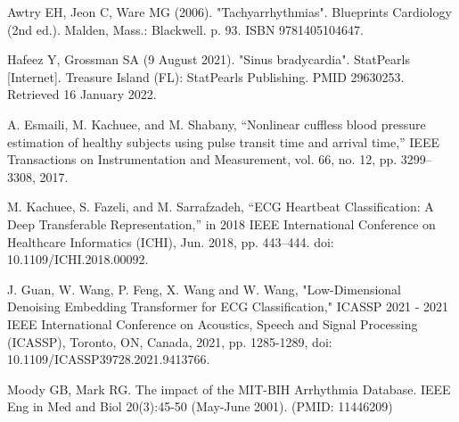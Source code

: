 \documentclass[conference]{IEEEtran}
\begin{document}
	\begin{thebibliography}{9}
	 Awtry EH, Jeon C, Ware MG (2006). "Tachyarrhythmias". Blueprints Cardiology (2nd ed.). Malden, Mass.: Blackwell. p. 93. ISBN 9781405104647.
	
	 Hafeez Y, Grossman SA (9 August 2021). "Sinus bradycardia". StatPearls [Internet]. Treasure Island (FL): StatPearls Publishing. PMID 29630253. Retrieved 16 January 2022.
	
	 A. Esmaili, M. Kachuee, and M. Shabany, “Nonlinear cuffless blood pressure estimation of healthy subjects using pulse transit time and arrival time,” IEEE Transactions on Instrumentation and Measurement, vol. 66, no. 12, pp. 3299–3308, 2017.
		
	 M. Kachuee, S. Fazeli, and M. Sarrafzadeh, “ECG Heartbeat Classification: A Deep Transferable Representation,” in 2018 IEEE International Conference on Healthcare Informatics (ICHI), Jun. 2018, pp. 443–444. doi: 10.1109/ICHI.2018.00092.
	
	 J. Guan, W. Wang, P. Feng, X. Wang and W. Wang, "Low-Dimensional Denoising Embedding Transformer for ECG Classification," ICASSP 2021 - 2021 IEEE International Conference on Acoustics, Speech and Signal Processing (ICASSP), Toronto, ON, Canada, 2021, pp. 1285-1289, doi: 10.1109/ICASSP39728.2021.9413766. 
	
	Moody GB, Mark RG. The impact of the MIT-BIH Arrhythmia Database. IEEE Eng in Med and Biol 20(3):45-50 (May-June 2001). (PMID: 11446209)
	
	

	\end{thebibliography}
	
  
  
\end{document}
